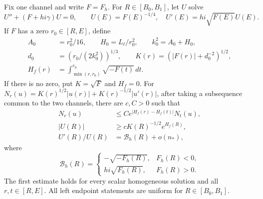 \begin{lemma}\label{spec:scalar-turn}
Fix one channel and write $F=F_h$. For $R\in[B_0,B_1]$, let $U$ solve
\[
 U''+(F+hi\gamma)U=0,\qquad
 U(E)=F(E)^{-1/4},\quad U'(E)=hi\sqrt{F(E)}U(E).
\]
If $F$ has a zero $r_0\in[R,E]$, define
\begin{equation}\label{spec:turn-scales}
 \begin{split}
 A_0&=r_0^2/16,\qquad H_0=L_\ell/r_0^2,\qquad k_0^2=A_0+H_0,\\
 d_0&=(r_0/(2k_0^2))^{1/3},\qquad
 K(r)=(|F(r)|+d_0^{-2})^{1/2},\\
 H_f(r)&=\int_{\min(r,r_0)}^{r_0}\sqrt{-F(t)}\,dt.
 \end{split}
\end{equation}
If there is no zero, put $K=\sqrt F$ and $H_f=0$.
For $N_r(u)=K(r)^{1/2}|u(r)|+K(r)^{-1/2}|u'(r)|$, after taking a
subsequence common to the two channels, there are $c,C>0$ such that
\begin{align}
 N_r(u)&\le C e^{|H_f(r)-H_f(t)|}N_t(u),\label{spec:scalar-transfer}\\
 |U(R)|&\ge cK(R)^{-1/2}e^{H_f(R)},\label{spec:scalar-value}\\
 U'(R)/U(R)&=\mathcal B_h(R)+o(n_*),\label{spec:scalar-slope}
 \end{align}
where
\[
 \mathcal B_h(R)=
 \begin{cases}-\sqrt{-F_h(R)},&F_h(R)<0,\\
 hi\sqrt{F_h(R)},&F_h(R)>0.
 \end{cases}
\]
The first estimate holds for every scalar homogeneous solution and
all $r,t\in[R,E]$. All left endpoint statements are uniform for
$R\in[B_0,B_1]$.
\end{lemma}

